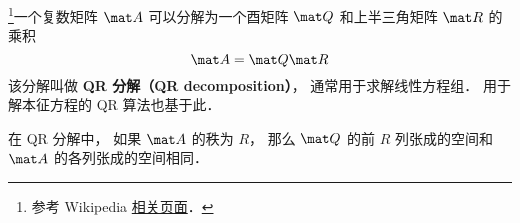 

\footnote{参考 Wikipedia \href{https://en.wikipedia.org/wiki/QR_decomposition}{相关页面}．}一个复数矩阵 $\mat A$ 可以分解为一个酉矩阵 $\mat Q$ 和上半三角矩阵 $\mat R$ 的乘积
\begin{equation}
\mat A = \mat Q\mat R
\end{equation}
该分解叫做 \textbf{QR 分解（QR decomposition）}， 通常用于求解线性方程组． 用于解本征方程的 QR 算法也基于此．

在 QR 分解中， 如果 $\mat A$ 的秩为 $R$， 那么 $\mat Q$ 的前 $R$ 列张成的空间和 $\mat A$ 的各列张成的空间相同．
